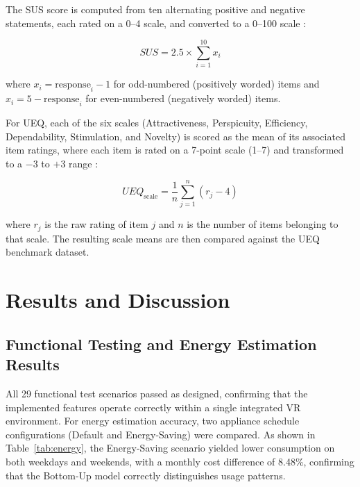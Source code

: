 \documentclass[conference]{IEEEtran}
\begin{document}
The SUS score is computed from ten alternating positive and negative statements, each rated on a 0--4 scale, and converted to a 0--100 scale \cite{brooke1996sus}:

\begin{equation}
SUS = 2.5 \times \sum_{i=1}^{10} x_i
\end{equation}

where $x_i = \text{response}_i - 1$ for odd-numbered (positively worded) items and $x_i = 5 - \text{response}_i$ for even-numbered (negatively worded) items.

For UEQ, each of the six scales (Attractiveness, Perspicuity, Efficiency, Dependability, Stimulation, and Novelty) is scored as the mean of its associated item ratings, where each item is rated on a 7-point scale (1--7) and transformed to a $-3$ to $+3$ range \cite{schrepp2023handbook}:

\begin{equation}
UEQ_{\text{scale}} = \frac{1}{n}\sum_{j=1}^{n}(r_j - 4)
\end{equation}

where $r_j$ is the raw rating of item $j$ and $n$ is the number of items belonging to that scale. The resulting scale means are then compared against the UEQ benchmark dataset.

\section{Results and Discussion}

\subsection{Functional Testing and Energy Estimation Results}

All 29 functional test scenarios passed as designed, confirming that the implemented features operate correctly within a single integrated VR environment. For energy estimation accuracy, two appliance schedule configurations (Default and Energy-Saving) were compared. As shown in Table~\ref{tab:energy}, the Energy-Saving scenario yielded lower consumption on both weekdays and weekends, with a monthly cost difference of 8.48\%, confirming that the Bottom-Up model correctly distinguishes usage patterns.
\end{document}
